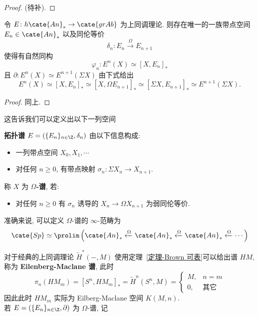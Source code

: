 \begin{proof}
    (待补).
\end{proof}
\begin{corollary}
    令 $E \colon h\cate{An}_* \to \cate{grAb}$ 为上同调理论. 则存在唯一的一族带点空间 $E_n \in \cate{An}_*$ 以及同伦等价
    \[
    \delta_n \colon E_n \xrightarrow{\Omega}E_{n+1}
    \]
    使得有自然同构
    \[
    \varphi_n \colon E^n(X) \simeq [X,E_n]_*
    \]
    且 $\partial \colon E^n(X) \simeq E^{n+1}(\Sigma X)$ 由下式给出
    \[
    E^n(X) \simeq [X,E_n]_* \simeq [X,\Omega E_{n+1}]_* \simeq [\Sigma X, E_{n+1}]_* \simeq E^{n+1}(\Sigma X).
    \]
\end{corollary}
\begin{proof}
    同上.
\end{proof}
这告诉我们可以定义出以下一列空间
\begin{definition}[拓扑谱]
    \textbf{拓扑谱} $E = (\{E_n\}_{n\in \Z}, \delta_n)$ 由以下信息构成:
    \begin{itemize}
        \item 一列带点空间 $X_0,X_1, \cdots$
        \item 对任何 $n \geq 0$, 有带点映射 $\sigma_n \colon \Sigma X_n \to X_{n+1}$.
    \end{itemize}
    称 $X$ 为 \textbf{$\Omega$-谱}, 若:
    \begin{itemize}
        \item 对任何 $n \geq 0$ 有 $\sigma_n$ 诱导的 $X_n \to \Omega X_{n+1}$ 为弱同伦等价.
    \end{itemize}
    准确来说, 可以定义 $\Omega$-谱的 $\infty$-范畴为
    \[
    \cate{Sp} \simeq \prolim \left(\cate{An}_* \xleftarrow{\Omega} \cate{An}_* \xleftarrow{\Omega}\cate{An}_* \xleftarrow{\Omega} \cdots\right)
    \]
\end{definition}
对于经典的上同调理论 $\tilde{H}^*(-,M)$ 使用定理~\ref{定理-Brown 可表}可以给出谱 $HM$, 称为 \textbf{Eilenberg-Maclane 谱}, 此时
\[
\pi_n(HM_m) = [S^n , HM_m]_* = \tilde{H}^n(S^n,M) = \left\{
\begin{array}{cc}
     M,& n=m \\
     0,& \text{其它} 
\end{array}\right.
\]
因此此时 $HM_m$ 实际为 Eilberg-Maclane 空间 $K(M,n)$.\\
若 $E = (\{E_n\}_{n\in \Z}, \partial)$ 为 $\Omega$-谱, 记